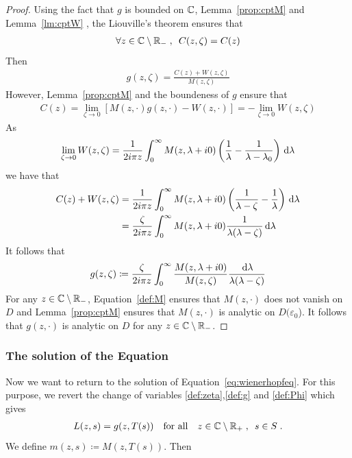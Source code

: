 \begin{proof}
Using the fact that $g$ is bounded on $\mathbb{C}$, Lemma~\ref{prop:cptM} and Lemma~\ref{lm:cptW}
, the Liouville's theorem ensures that
\begin{align*}
    \forall z \in \mathbb{C} \setminus \mathbb{R}_-
    \; , \enspace
    C(z,\zeta) = C(z)
\end{align*}
Then 
\begin{align}
    g(z,\zeta) = \frac{C(z)+W(z,\zeta)}{M(z,\zeta)}
\end{align}
However, Lemma~\ref{prop:cptM} and the boundeness of $g$ ensure that
\begin{align}
C(z) 
= \lim_{\zeta \to 0}[M(z,\cdot)g(z,\cdot) - W(z,\cdot)] 
= -\lim_{\zeta \to 0}W(z,\zeta)
\end{align}
As
$$ \lim_{\zeta \to 0}W(z,\zeta) 
= \frac{1}{2i\pi z}\int_0^\infty  {M(z,\lambda+i0)}\left( \frac{1}{\lambda} - \frac{1}{\lambda-\lambda_0}\right) \,\mathrm{d} \lambda $$
we have that
\begin{align*}
    C(z) + W(z,\zeta)
    &= 
    \frac{1}{2i \pi z}\int_0^\infty  {M(z,\lambda+i0)}\left( \frac{1}{\lambda-\zeta}-\frac{1}{\lambda}\right) \,\mathrm{d} \lambda \\
    &= 
    \frac{\zeta}{2i\pi z}\int_0^\infty  {M(z,\lambda+i0)}\frac{1}{\lambda(\lambda-\zeta)} \,\mathrm{d} \lambda \\
\end{align*}
It follows that 
\begin{align}
    g(z,\zeta) 
    &\coloneqq 
    \frac{\zeta}{2i \pi z}\int_0^\infty  \frac{M(z,\lambda+i0)}{M(z,\zeta)} \frac{\,\mathrm{d} \lambda}{\lambda(\lambda-\zeta)} \\
\end{align}
For any $z \in \mathbb{C} \setminus \mathbb{R}_-$, Equation~\eqref{def:M} ensures that $M(z, \cdot)$ does not vanish on $D$ and Lemma~\ref{prop:cptM} ensures that $M(z, \cdot)$ is analytic on $D(\varepsilon_0$). It follows that $g(z, \cdot)$ is analytic on $D$ for any $z \in \mathbb{C} \setminus \mathbb{R}_-$.

\end{proof}

\subsubsection{The solution of the Equation}
Now we want to return to the solution of Equation~\eqref{eq:wienerhopfeq}. For this purpose, we revert the change of variables \eqref{def:zeta},\eqref{def:g} and \eqref{def:Phi} which gives
\begin{align}
    L(z,s) = g(z, T(s)) \quad \text{for all} \quad z \in \mathbb{C} \setminus \mathbb{R}_+ \; , \enspace s \in S 
    \; .
\end{align}
We define $m(z,s) \coloneqq M(z, T(s))$. Then


